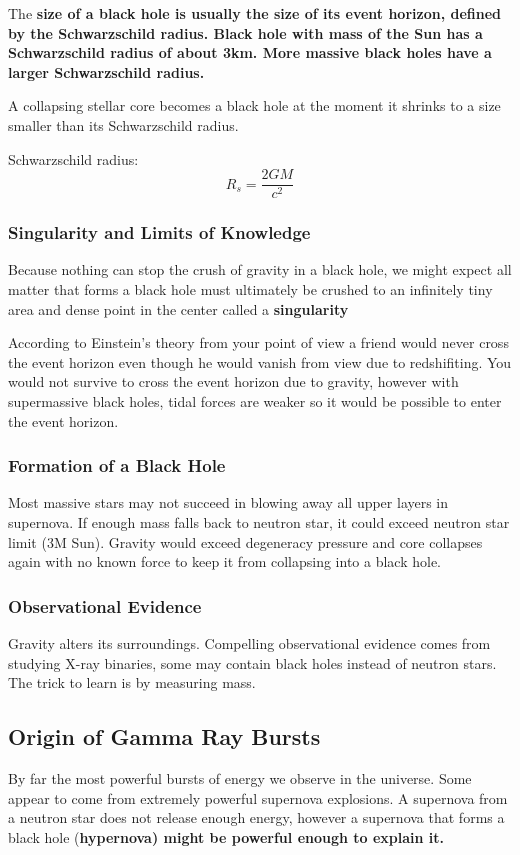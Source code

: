 The \bf{size} of a black hole is usually the size of its event horizon, defined by the \bf{Schwarzschild radius}. Black hole with mass of the Sun has a Schwarzschild radius of about 3km. More massive black holes have a larger Schwarzschild radius.

A collapsing stellar core becomes a black hole at the moment it shrinks to a size smaller than its Schwarzschild radius.

Schwarzschild radius: \[ R_s = \frac{2GM}{c^2} \]

\subsubsection{Singularity and Limits of Knowledge}
Because nothing can stop the crush of gravity in a black hole, we might expect all matter that forms a black hole must ultimately be crushed to an infinitely tiny area and dense point in the center called a \bf{singularity}

According to Einstein's theory from your point of view a friend would never cross the event horizon even though he would vanish from view due to redshifiting. You would not survive to cross the event horizon due to gravity, however with supermassive black holes, tidal forces are weaker so it would be possible to enter the event horizon.

\subsubsection{Formation of a Black Hole}

Most massive stars may not succeed in blowing away all upper layers in supernova. If enough mass falls back to neutron star, it could exceed neutron star limit (3M Sun). Gravity would exceed degeneracy pressure and core collapses again with no known force to keep it from collapsing into a black hole.

\subsubsection{Observational Evidence}
Gravity alters its surroundings. Compelling observational evidence comes from studying X-ray binaries, some may contain black holes instead of neutron stars. The trick to learn is by measuring mass.

\subsection{Origin of Gamma Ray Bursts}
By far the most powerful bursts of energy we observe in the universe. Some appear to come from extremely powerful supernova explosions. A supernova from a neutron star does not release enough energy, however a supernova that forms a black hole (\bf{hypernova}) might be powerful enough to explain it.

